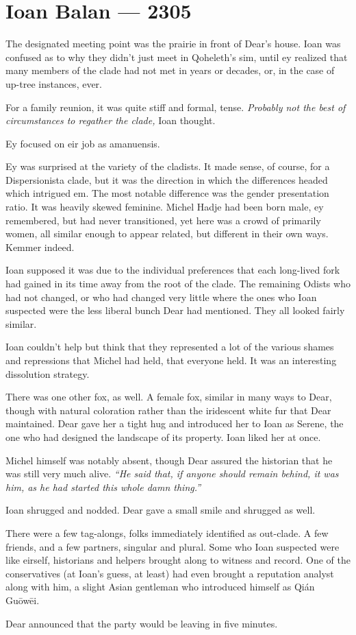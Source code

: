 \hypertarget{ioan-balan-2305}{%
\chapter*{Ioan Balan — 2305}\label{ioan-balan-2305}}

The designated meeting point was the prairie in front of Dear's house. Ioan was confused as to why they didn't just meet in Qoheleth's sim, until ey realized that many members of the clade had not met in years or decades, or, in the case of up-tree instances, ever.

For a family reunion, it was quite stiff and formal, tense. \emph{Probably not the best of circumstances to regather the clade,} Ioan thought.

Ey focused on eir job as amanuensis.

Ey was surprised at the variety of the cladists. It made sense, of course, for a Dispersionista clade, but it was the direction in which the differences headed which intrigued em. The most notable difference was the gender presentation ratio. It was heavily skewed feminine. Michel Hadje had been born male, ey remembered, but had never transitioned, yet here was a crowd of primarily women, all similar enough to appear related, but different in their own ways. Kemmer indeed.

Ioan supposed it was due to the individual preferences that each long-lived fork had gained in its time away from the root of the clade. The remaining Odists who had not changed, or who had changed very little where the ones who Ioan suspected were the less liberal bunch Dear had mentioned. They all looked fairly similar.

Ioan couldn't help but think that they represented a lot of the various shames and repressions that Michel had held, that everyone held. It was an interesting dissolution strategy.

There was one other fox, as well. A female fox, similar in many ways to Dear, though with natural coloration rather than the iridescent white fur that Dear maintained. Dear gave her a tight hug and introduced her to Ioan as Serene, the one who had designed the landscape of its property. Ioan liked her at once.

Michel himself was notably absent, though Dear assured the historian that he was still very much alive. \emph{``He said that, if anyone should remain behind, it was him, as he had started this whole damn thing.''}

Ioan shrugged and nodded. Dear gave a small smile and shrugged as well.

There were a few tag-alongs, folks immediately identified as out-clade. A few friends, and a few partners, singular and plural. Some who Ioan suspected were like eirself, historians and helpers brought along to witness and record. One of the conservatives (at Ioan's guess, at least) had even brought a reputation analyst along with him, a slight Asian gentleman who introduced himself as Qián Guōwēi.

Dear announced that the party would be leaving in five minutes.
